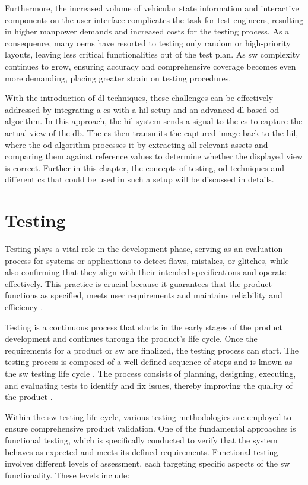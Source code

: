 Furthermore, the increased volume of vehicular state information and interactive components on the user interface complicates the task for test engineers, resulting in higher manpower demands and increased costs for the testing process. As a consequence, many \gls{oem}s have resorted to testing only random or high-priority layouts, leaving less critical functionalities out of the test plan. As \gls{sw} complexity continues to grow, ensuring accuracy and comprehensive coverage becomes even more demanding, placing greater strain on testing procedures.

With the introduction of \gls{dl} techniques, these challenges can be effectively addressed by integrating a \gls{cs} with a \gls{hil} setup and an advanced \gls{dl} based \gls{od} algorithm. In this approach, the \gls{hil}  system sends a signal to the \gls{cs} to capture the actual view of the \gls{db}. The \gls{cs} then transmits the captured image back to the \gls{hil}, where the \gls{od} algorithm processes it by extracting all relevant assets and comparing them against reference values to determine whether the displayed view is correct. Further in this chapter, the concepts of testing, \gls{od} techniques and different \gls{cs} that could be used in such a setup will be discussed in details.


\section{Testing}
Testing plays a vital role in the development phase, serving as an evaluation process for systems or applications to detect flaws, mistakes, or glitches, while also confirming that they align with their intended specifications and operate effectively. This practice is crucial because it guarantees that the product functions as specified, meets user requirements and maintains reliability and efficiency \cite{leloudas2023}.

Testing is a continuous process that starts in the early stages of the product development and continues through the product's life cycle. Once the requirements for a product or \gls{sw} are finalized, the testing process can start. The testing process is composed of a well-defined sequence of steps and is known as the \gls{sw} testing life cycle \cite{ML_SW_Testing}. The process consists of planning, designing, executing, and evaluating tests to identify and fix issues, thereby improving the quality of the product \cite{leloudas2023}.

Within the \gls{sw} testing life cycle, various testing methodologies are employed to ensure comprehensive product validation. One of the fundamental approaches is functional testing, which is specifically conducted to verify that the system behaves as expected and meets its defined requirements. Functional testing involves different levels of assessment, each targeting specific aspects of the \gls{sw} functionality. These levels include:

